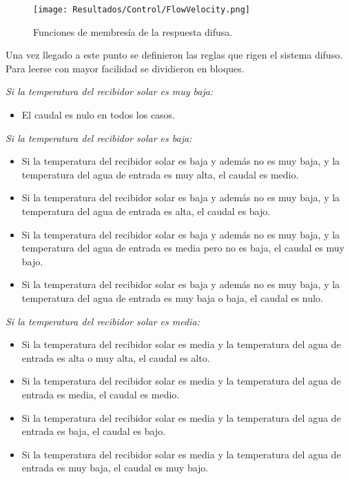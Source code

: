 			\begin{figure}[H]
				\centering
				\texttt{[image: Resultados/Control/FlowVelocity.png]}
				\caption{Funciones de membresía de la respuesta difusa.}
				\label{fig:FlowVelocity}
			\end{figure}
			
			Una vez llegado a este punto se definieron las reglas que rigen el sistema difuso. Para leerse con mayor facilidad se dividieron en bloques.
			
			\textit{Si la temperatura del recibidor solar es muy baja:}\par
			
			\begin{itemize}
				\item El caudal es nulo en todos los casos.
			\end{itemize}
			
			\textit{Si la temperatura del recibidor solar es baja:}\par
			\begin{itemize}
				\item Si la temperatura del recibidor solar es baja y además no es muy baja, y la temperatura del agua de entrada es muy alta, el caudal es medio.
				\item Si la temperatura del recibidor solar es baja y además no es muy baja, y la temperatura del agua de entrada es alta, el caudal es bajo.
				\item Si la temperatura del recibidor solar es baja y además no es muy baja, y la temperatura del agua de entrada es media pero no es baja, el caudal es muy bajo.
				\item Si la temperatura del recibidor solar es baja y además no es muy baja, y la temperatura del agua de entrada es muy baja o baja, el caudal es nulo.
			\end{itemize}
			
			\textit{Si la temperatura del recibidor solar es media:}\par
			\begin{itemize}
				\item Si la temperatura del recibidor solar es media y la temperatura del agua de entrada es alta o muy alta, el caudal es alto.
				\item Si la temperatura del recibidor solar es media y la temperatura del agua de entrada es media, el caudal es medio.
				\item Si la temperatura del recibidor solar es media y la temperatura del agua de entrada es baja, el caudal es bajo.
				\item Si la temperatura del recibidor solar es media y la temperatura del agua de entrada es muy baja, el caudal es muy bajo.
				
			\end{itemize}
			
